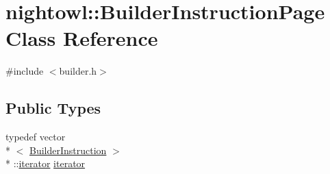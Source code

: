 \hypertarget{classnightowl_1_1BuilderInstructionPage}{\section{nightowl\-:\-:Builder\-Instruction\-Page Class Reference}
\label{classnightowl_1_1BuilderInstructionPage}
}


{\ttfamily \#include $<$builder.\-h$>$}

\subsection*{Public Types}
\begin{DoxyCompactItemize}
\item 
typedef vector\\*
$<$ \hyperlink{classnightowl_1_1BuilderInstruction}{Builder\-Instruction} $>$\\*
\-::\hyperlink{classnightowl_1_1BuilderInstructionPage_a58693e169efec9daf99b36da52049099}{iterator} \hyperlink{classnightowl_1_1BuilderInstructionPage_a58693e169efec9daf99b36da52049099}{iterator}
\end{DoxyCompactItemize}
